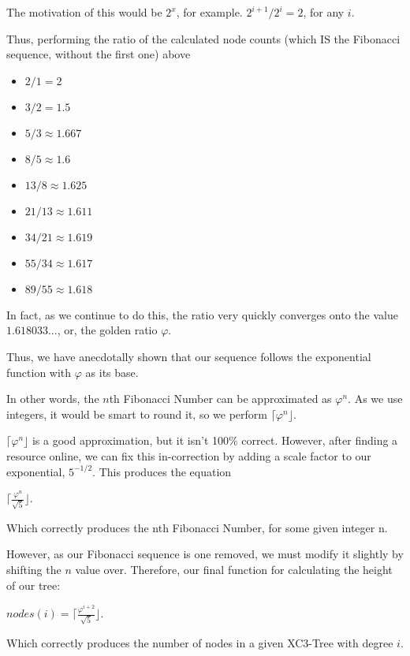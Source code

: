 \documentclass{article}
\begin{document}
The motivation of this would be $2^x$, for example. $2^{i+1} / 2^{i} = 2$, for any $i$.

Thus, performing the ratio of the calculated node counts (which IS the Fibonacci sequence, without the first one) above

\begin{itemize}
    \item $2 / 1 = 2$
    \item $3 / 2 = 1.5$
    \item $5 / 3 \approx 1.667$
    \item $8 / 5 \approx 1.6$
    \item $13 / 8 \approx 1.625$
    \item $21 / 13 \approx 1.611$
    \item $34 / 21 \approx 1.619$
    \item $55 / 34 \approx 1.617$
    \item $89 / 55 \approx 1.618$
\end{itemize}

In fact, as we continue to do this, the ratio very quickly converges onto the value $1.618033...$, or, the golden ratio $\varphi$.

Thus, we have anecdotally shown that our sequence follows the exponential function with $\varphi$ as its base.

In other words, the $n$th Fibonacci Number can be approximated as $\varphi^{n}$. As we use integers, it would be smart to round it, so we perform $\lceil \varphi^{n} \rfloor$.

$\lceil \varphi^{n} \rfloor$ is a good approximation, but it isn't 100\% correct. However, after finding a resource online, we can fix this in-correction by adding a scale factor to our exponential, $5^{-1/2}$. This produces the equation

{
\Large
\begin{center}
    $\lceil \frac{\varphi^{n}}{\sqrt{5}} \rfloor$.\\
    $ $
\end{center}
}
Which correctly produces the nth Fibonacci Number, for some given integer n.

However, as our Fibonacci sequence is one removed, we must modify it slightly by shifting the $n$ value over. Therefore, our final function for calculating the height of our tree:


{
\Large
\begin{center}
    $nodes(i) = \lceil \frac{\varphi^{i+2}}{\sqrt{5}} \rfloor$.\\
    $ $
\end{center}
}
Which correctly produces the number of nodes in a given XC3-Tree with degree $i$.
\end{document}
